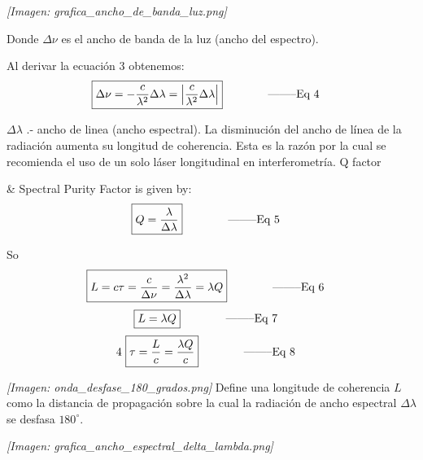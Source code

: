 \documentclass[12pt]{article}
\begin{document}
	\begin{minipage}{0.5\textwidth}
		\textit{[Imagen: grafica\_ancho\_de\_banda\_luz.png]}
	\end{minipage}
	\hfill
	\begin{minipage}{0.45\textwidth}
		Donde $\Delta \nu$ es el ancho de banda de la luz (ancho del espectro).
	\end{minipage}
	
	\vspace{0.5cm}
	Al derivar la ecuación 3 obtenemos:
	\begin{align*}
		\text{\fbox{$\Delta \nu = -\frac{c}{\lambda^2} \Delta \lambda = \left| \frac{c}{\lambda^2} \Delta \lambda \right|$}} \qquad \qquad &\text{--------Eq 4}
	\end{align*}
	
	$\Delta \lambda$ .- ancho de linea (ancho espectral). La disminución del ancho de línea de la radiación aumenta su longitud de coherencia. Esta es la razón por la cual se recomienda el uso de un solo láser longitudinal en interferometría. Q factor
	
	\& Spectral Purity Factor is given by:
	\begin{align*}
		\text{\fbox{$Q = \frac{\lambda}{\Delta \lambda}$}} \qquad \qquad &\text{--------Eq 5}
	\end{align*}
	
	So
	\begin{align*}
		\text{\fbox{$L = c \tau = \frac{c}{\Delta \nu} = \frac{\lambda^2}{\Delta \lambda} = \lambda Q$}} \qquad \qquad &\text{--------Eq 6}
	\end{align*}
	\begin{align*}
		\text{\fbox{$L = \lambda Q$}} \qquad \qquad &\text{--------Eq 7}
	\end{align*}
	\begin{align*}
		4 \text{ \fbox{$\tau = \frac{L}{c} = \frac{\lambda Q}{c}$}} \qquad \qquad &\text{--------Eq 8}
	\end{align*}
	
	\begin{minipage}{0.5\textwidth}
		\textit{[Imagen: onda\_desfase\_180\_grados.png]}
		Define una longitude de coherencia $L$ como la distancia de propagación sobre la cual la radiación de ancho espectral $\Delta \lambda$ se desfasa $180 ^\circ$.
	\end{minipage}
	\hfill
	\begin{minipage}{0.45\textwidth}
		\textit{[Imagen: grafica\_ancho\_espectral\_delta\_lambda.png]}
	\end{minipage}
	
\end{document}
